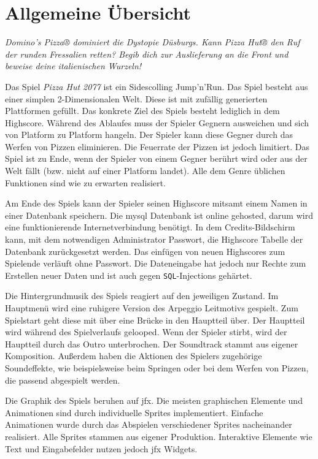 \section{Allgemeine Übersicht}

\textit{
Domino's Pizza® dominiert die Dystopie Düsburgs.
Kann Pizza Hut® den Ruf der runden Fressalien retten?
Begib dich zur Auslieferung an die Front und beweise deine italienischen Wurzeln!
}

Das Spiel \textit{Pizza Hut 2077} ist ein Sidescolling Jump'n'Run.
Das Spiel besteht aus einer simplen 2-Dimensionalen Welt.
Diese ist mit zufällig generierten Plattformen gefüllt.
Das konkrete Ziel des Spiels besteht lediglich in dem Highscore.
Während des Ablaufes muss der Spieler Gegnern ausweichen und sich von Platform zu Platform hangeln.
Der Spieler kann diese Gegner durch das Werfen von Pizzen eliminieren.
Die Feuerrate der Pizzen ist jedoch limitiert.
Das Spiel ist zu Ende, wenn der Spieler von einem Gegner berührt wird oder aus der Welt fällt (bzw. nicht auf einer Platform landet).
Alle dem Genre üblichen Funktionen sind wie zu erwarten realisiert.

Am Ende des Spiels kann der Spieler seinen Highscore mitsamt einem Namen in einer Datenbank speichern.
Die \gls{mysql} Datenbank ist online gehosted, darum wird eine funktionierende Internetverbindung benötigt.
In dem Credits-Bildschirm kann, mit dem notwendigen Administrator Passwort, die Highscore Tabelle der Datenbank zurückgesetzt werden.
Das einfügen von neuen Highscores zum Spielende verläuft ohne Passwort.
Die Dateneingabe hat jedoch nur Rechte zum Erstellen neuer Daten und ist auch gegen \texttt{SQL}-Injections gehärtet.

Die Hintergrundmusik des Spiels reagiert auf den jeweiligen Zustand.
Im Hauptmenü wird eine ruhigere Version des Arpeggio Leitmotivs gespielt.
Zum Spielstart geht diese mit über eine Brücke in den Hauptteil über.
Der Hauptteil wird während des Spielverlaufs gelooped.
Wenn der Spieler stirbt, wird der Hauptteil durch das Outro unterbrochen.
Der Soundtrack stammt aus eigener Komposition.
Außerdem haben die Aktionen des Spielers zugehörige Soundeffekte, wie beispielsweise beim Springen oder bei dem Werfen von Pizzen, die passend abgespielt werden.

Die Graphik des Spiels beruhen auf \gls{jfx}.
Die meisten graphischen Elemente und Animationen sind durch individuelle Sprites implementiert.
Einfache Animationen wurde durch das Abspielen verschiedener Sprites nacheinander realisiert.
Alle Sprites stammen aus eigener Produktion.
Interaktive Elemente wie Text und Eingabefelder nutzen jedoch \gls{jfx} Widgets.

